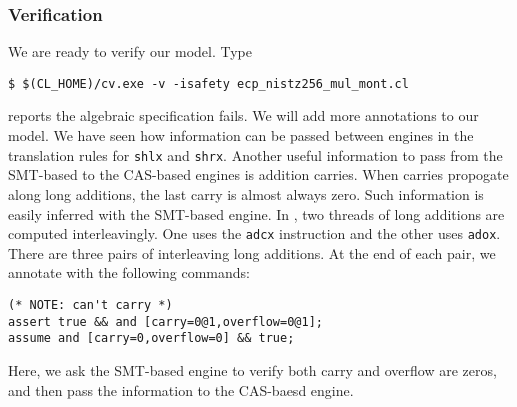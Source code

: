 \documentclass{amsproc}
\begin{document}
\subsubsection{Verification}

We are ready to verify our model. Type
\begin{verbatim}
$ $(CL_HOME)/cv.exe -v -isafety ecp_nistz256_mul_mont.cl
\end{verbatim}

\cryptoline reports the algebraic specification fails. We will add
more annotations to our model. We have seen how information can be
passed between engines in the translation rules for \texttt{shlx} and
\texttt{shrx}. Another useful information to pass from the SMT-based
to the CAS-based 
engines is addition carries. When carries propogate along long
additions, the last carry is almost always zero. Such information is
easily inferred with the SMT-based engine. In \nistzmul, two threads
of long additions are computed interleavingly. One uses the
\xeightysix \texttt{adcx} instruction and the other uses
\texttt{adox}. There are three pairs of interleaving long
additions. At the end of each pair, we annotate \nistzmulcl with the
following commands:
\begin{verbatim}
(* NOTE: can't carry *)
assert true && and [carry=0@1,overflow=0@1];
assume and [carry=0,overflow=0] && true;
\end{verbatim}
Here, we ask the SMT-based engine to verify both carry and overflow
are zeros, and then pass the information to the CAS-baesd engine.
\end{document}
